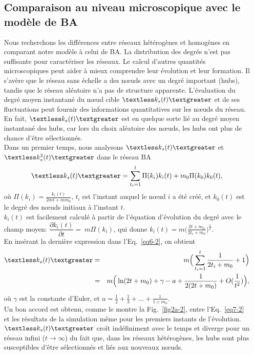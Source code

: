 \subsection{Comparaison au niveau microscopique avec le modèle de BA}
Nous recherchons les différences entre réseaux hétérogènes et homogènes en comparant notre modèle à celui de BA. La distribution des degrés n'est pas suffisante pour caractériser les réseaux. Le calcul d'autres quantités microscopiques peut aider à mieux comprendre leur évolution et leur formation. Il s'avère que le réseau sans échelle a des nœuds avec un degré important (hubs), tandis que le réseau aléatoire n'a pas de structure apparente. L'évaluation du degré moyen instantané du nœud cible $\kms$ et de ses fluctuations peut fournir des informations quantitatives sur les nœuds du réseau. En fait, $\kms$ est en quelque sorte lié au degré moyen instantané des hubs, car lors du choix aléatoire des nœuds, les hubs ont plus de chance d'être sélectionnés. \\  
Dans un premier temps, nous analysons $\kms$ et $\kmss$ dans le réseau BA
\begin{eqnarray}
\kms=\sum_{t_i=1}^t\Pi(k_i)k_i(t)+m_0\Pi(k_0)k_0(t),
\label{eq6-2}
\end{eqnarray}
où  $\Pi(k_i)=\frac{k_i(t)}{2mt+mm_0}$, $t_i$ est l'instant auquel le nœud $ i $ a été créé, et $ k_0 (t) $ est le degré des nœuds initiaux à l'instant $t$.\\
$k_i (t)$ est facilement calculé à partir de l'équation d'évolution du degré avec le champ moyen:
$\dfrac{\partial k_i(t)}{\partial t}=~ m\Pi(k_i)$, qui donne $k_i(t)=m\Big(\frac{2t+m_0}{2t_i+m_0}\Big)^{\frac{1}{2}}$.\\
En insérant la dernière expression dans l'Eq.~\eqref{eq6-2}, on obtient
\begin{eqnarray}
\kms&=&m\Big(\sum_{t_i=1}^{t}\dfrac{1}{2t_i+m_0}+1\Big) \\
&=&m \Big(\ln (2t+m_0)+\gamma-a+\frac{1}{2(2t+m_0)}+O(\frac{1}{t^2})\Big),
\label{eq7-2}
\end{eqnarray}
où $\gamma$ est la constante d'Euler, et $a=\frac{1}{2}+\frac{1}{3}+\ldots+\frac{1}{1+m_0}$.\\
Un bon accord est obtenu, comme le montre la Fig.~\ref{fig2a-2}, entre l'Eq.~\eqref{eq7-2} et les résultats de la simulation même pour les premiers instants de l'évolution. $\kms$ croît indéfiniment avec le temps et diverge pour un réseau infini ($t\to\infty$) du fait que, dans les réseaux hétérogènes, les hubs sont plus susceptibles d'être sélectionnés et liés aux nouveaux nœuds. \\
